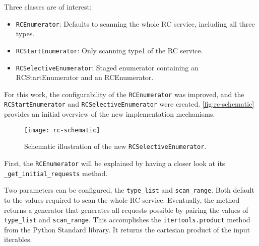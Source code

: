 Three classes are of interest:

\begin{itemize}
    \item \texttt{RCEnumerator}: Defaults to scanning the whole RC service, including all three types.
    \item \texttt{RCStartEnumerator}: Only scanning type1 of the RC service.
    \item \texttt{RCSelectiveEnumerator}: Staged enumerator containing an RCStartEnumerator and an RCEnumerator.
\end{itemize}

For this work, the configurability of the \texttt{RCEnumerator} was improved, and the \texttt{RCStartEnumerator} and \texttt{RCSelectiveEnumerator} were created. 
\autoref{fig:rc-schematic} provides an initial overview of the new implementation mechanisms.

\begin{figure}[htb]
    \centering
    \texttt{[image: rc-schematic]}
    \caption{Schematic illustration of the new \texttt{RCSelectiveEnumerator}.}
    \label{fig:rc-schematic}
\end{figure}


First, the \texttt{RCEnumerator} will be explained by having a closer look at its \texttt{_get_initial_requests} method.


Two parameters can be configured, the \texttt{type_list} and \texttt{scan_range}. 
Both default to the values required to scan the whole RC service. Eventually, the method returns a generator that generates all requests possible by pairing the values of \texttt{type_list} and \texttt{scan_range}. 
This accomplishes the \texttt{itertools.product} method from the Python Standard library. 
It returns the cartesian product of the input iterables.

